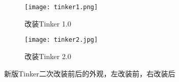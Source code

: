 \begin{figure}
\centering
\begin{subfigure}{.5\textwidth}
  \centering
  \texttt{[image: tinker1.png]}
  \caption{改装Tinker 1.0}
  \label{fig:tinker1}
\end{subfigure}%
\begin{subfigure}{.5\textwidth}
  \centering
  \texttt{[image: tinker2.jpg]}
  \caption{改装Tinker 2.0}
  \label{fig:tinker2}
\end{subfigure}
\caption{新版Tinker二次改装前后的外观，左改装前，右改装后}
\label{fig:tinker_new}
\end{figure}




\fi









